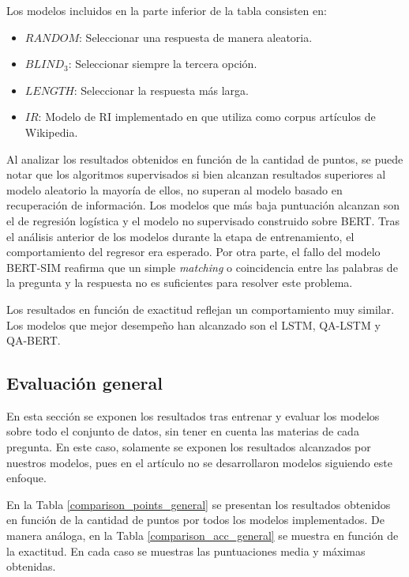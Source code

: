 Los modelos incluidos en la parte inferior de la tabla consisten en:
\begin{itemize}
  \item $RANDOM$: Seleccionar una respuesta de manera aleatoria.
  \item $BLIND_3$: Seleccionar siempre la tercera opción.
  \item $LENGTH$: Seleccionar la respuesta más larga.
  \item $IR$: Modelo de RI implementado en \cite{2019-head-qa} que utiliza como corpus artículos de Wikipedia.
\end{itemize}

Al analizar los resultados obtenidos en función de la cantidad de puntos, se puede notar que los algoritmos supervisados si bien alcanzan resultados superiores al modelo aleatorio la mayoría de ellos, no superan al modelo basado en recuperación de información. Los modelos que más baja puntuación alcanzan son el de regresión logística y el modelo no supervisado construido sobre BERT.
Tras el análisis anterior de los modelos durante la etapa de entrenamiento, el comportamiento del regresor era esperado. Por otra parte, el fallo del modelo BERT-SIM reafirma que un simple \textit{matching} o coincidencia entre las palabras de la pregunta y la respuesta no es suficientes para resolver este problema.

Los resultados en función de exactitud reflejan un comportamiento muy similar. Los modelos que mejor desempeño han alcanzado son el LSTM, QA-LSTM y QA-BERT.

\subsection{Evaluación general}

En esta sección se exponen los resultados tras entrenar y evaluar los modelos sobre todo el conjunto de datos, sin tener en cuenta las materias de cada pregunta. En este caso, solamente se exponen los resultados alcanzados por nuestros modelos, pues en el artículo \cite{2019-head-qa} no se desarrollaron modelos siguiendo este enfoque. 

En la Tabla \ref{comparison_points_general} se presentan los resultados obtenidos en función de la cantidad de puntos por todos los modelos implementados. De manera análoga, en la Tabla \ref{comparison_acc_general} se muestra en función de la exactitud. En cada caso se muestras las puntuaciones media y máximas obtenidas.

